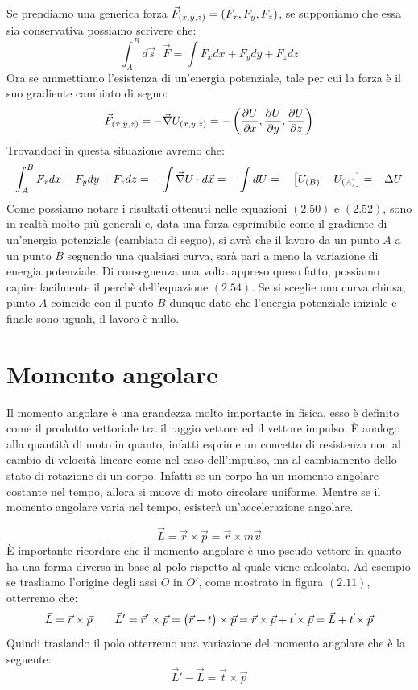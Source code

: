 Se prendiamo una generica forza $\vec F_{\left( x,y,z\right)} = \left( F_x,F_y,F_z\right)$, se supponiamo che essa sia conservativa possiamo scrivere che:
\begin{equation}
\int_A^Bd\vec s\cdot \vec F = \int F_xdx+F_ydy+F_zdz
\end{equation}
Ora se ammettiamo l'esistenza di un'energia potenziale, tale per cui la forza è il suo gradiente cambiato di segno:
\begin{equation}
\vec F_{\left( x,y,z\right)} = -\vec\nabla U_{\left( x,y,z\right)} = -\left(\frac{\partial U}{\partial x},\frac{\partial U}{\partial y},\frac{\partial U}{\partial z}\right)
\end{equation}
Trovandoci in questa situazione avremo che:
\begin{equation}
\int_A^B F_xdx+F_ydy+F_zdz = -\int\vec \nabla U\cdot d\vec x = -\int dU = -\left[ U_{(B)}-U_{(A)}\right] = -\Delta U
\end{equation}
Come possiamo notare i risultati ottenuti nelle equazioni $(2.50)$ e $(2.52)$, sono in realtà molto più generali e, data una forza esprimibile come il gradiente di un'energia potenziale (cambiato di segno), si avrà che il lavoro da un punto $A$ a un punto $B$ seguendo una qualsiasi curva, sarà pari a meno la variazione di energia potenziale. Di conseguenza una volta appreso queso fatto, possiamo capire facilmente il perchè dell'equazione $(2.54)$. Se si sceglie una curva chiusa, punto $A$ coincide con il punto $B$ dunque dato che l'energia potenziale iniziale e finale sono uguali, il lavoro è nullo.

\section{Momento angolare}
Il momento angolare è una grandezza molto importante in fisica, esso è definito come il prodotto vettoriale tra il raggio vettore ed il vettore impulso. È analogo alla quantità di moto in quanto, infatti esprime un concetto di resistenza non al cambio di velocità lineare come nel caso dell'impulso, ma al cambiamento dello stato di rotazione di un corpo.
Infatti se un corpo ha un momento angolare costante nel tempo, allora si muove di moto circolare uniforme. Mentre se il momento angolare varia nel tempo, esisterà un'accelerazione angolare.

\begin{equation}
\boxed{\vec L = \vec r \times \vec p = \vec r \times m\vec v}
\end{equation}
È importante ricordare che il momento angolare è uno pseudo-vettore in quanto ha una forma diversa in base al polo rispetto al quale viene calcolato. Ad esempio se trasliamo l'origine degli assi $O$ in $O'$, come mostrato in figura $(2.11)$, otterremo che:
\begin{equation}
\vec L = \vec r \times \vec p\quad \quad \vec L' = \vec r '\times\vec p = \left(\vec r + \vec t\right)\times \vec p = \vec r \times \vec p + \vec t\times\vec p = \vec L + \vec t\times\vec p
\end{equation}
Quindi traslando il polo otterremo una variazione del momento angolare che è la seguente:
\begin{equation}
\boxed{\vec L'-\vec L = \vec t\times\vec p}
\end{equation}
 
